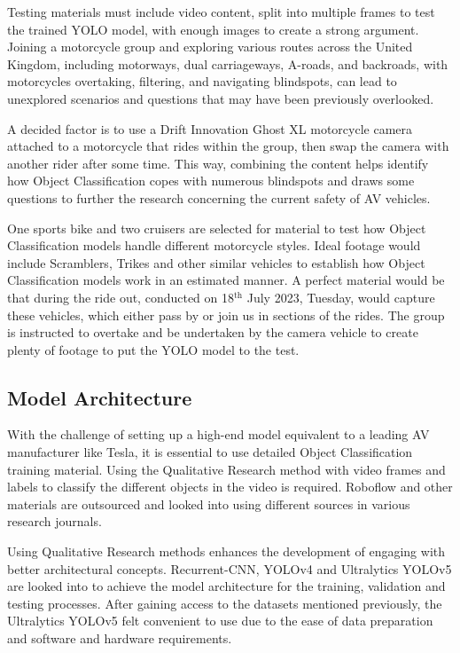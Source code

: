\documentclass[conference]{IEEEtran}
\begin{document}
		Testing materials must include video content, split into multiple frames to test the trained YOLO model, with enough images to create a strong argument. Joining a motorcycle group and exploring various routes across the United Kingdom, including motorways, dual carriageways, A-roads, and backroads, with motorcycles overtaking, filtering, and navigating blindspots, can lead to unexplored scenarios and questions that may have been previously overlooked.
					
		A decided factor is to use a Drift Innovation Ghost XL motorcycle camera attached to a motorcycle that rides within the group, then swap the camera with another rider after some time. This way, combining the content helps identify how Object Classification copes with numerous blindspots and draws some questions to further the research concerning the current safety of AV vehicles. 
		
		One sports bike and two cruisers are selected for material to test how Object Classification models handle different motorcycle styles. Ideal footage would include Scramblers, Trikes and other similar vehicles to establish how Object Classification models work in an estimated manner. A perfect material would be that during the ride out, conducted on 18$^\text{th}$ July 2023, Tuesday, would capture these vehicles, which either pass by or join us in sections of the rides. The group is instructed to overtake and be undertaken by the camera vehicle to create plenty of footage to put the YOLO model to the test.

	\subsection{Model Architecture}
        With the challenge of setting up a high-end model equivalent to a leading AV manufacturer like Tesla, it is essential to use detailed Object Classification training material. Using the Qualitative Research method with video frames and labels to classify the different objects in the video is required. Roboflow and other materials are outsourced and looked into using different sources in various research journals. 
        
        Using Qualitative Research methods enhances the development of engaging with better architectural concepts. Recurrent-CNN, YOLOv4 and Ultralytics YOLOv5 are looked into to achieve the model architecture for the training, validation and testing processes. After gaining access to the datasets mentioned previously, the Ultralytics YOLOv5 felt convenient to use due to the ease of data preparation and software and hardware requirements.
\end{document}
